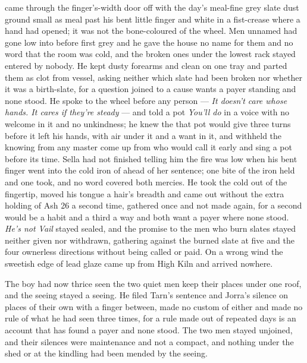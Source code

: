  came through the finger's-width door off  with the day's meal-fine grey slate dust ground small as meal past his bent little finger and white in a fist-crease where a hand had opened; it was not the bone-coloured  of the wheel. Men unnamed had gone low into  before first grey and he gave the house no name for them and no word that the room was cold, and the broken ones under the lowest rack stayed entered by nobody. He kept dusty forearms and clean on one tray and parted them as clot from vessel, asking neither which slate had been broken nor whether it was a birth-slate, for a question joined to a cause wants a payer standing and none stood. He spoke to the wheel before any person --- \emph{It doesn't care whose hands. It cares if they're steady} --- and told a pot \emph{You'll do} in a voice with no welcome in it and no unkindness; he knew the  that pot would give three turns before it left his hands, with air under it and a want in it, and withheld the knowing from any master come up from  who would call it early and sing a pot before its time. Sella had not finished telling him the fire was low when his bent finger went into the cold iron of  ahead of her sentence; one bite of the iron held and one took, and no  word covered both mercies. He took the cold out of the fingertip, moved his tongue a hair's breadth and came out without the extra holding of Ash 26 a second time, gathered once and not made again, for a second would be a habit and a third a way and both want a payer where none stood. \emph{He's not Vail} stayed sealed, and the promise to the men who burn slates stayed neither given nor withdrawn, gathering against the burned slate at five and the four ownerless directions without being called or paid. On a wrong wind the sweetish edge of lead glaze came up from High Kiln and arrived nowhere.

The boy had now thrice seen the two quiet men keep their places under one roof, and the seeing stayed a seeing. He filed Tarn's sentence and Jorra's silence on places of their own with a finger between, made no custom of either and made no rule of what he had seen three times, for a rule made out of repeated days is an account that has found a payer and none stood. The two men stayed unjoined, and their silences were maintenance and not a compact, and nothing under the shed or at the kindling had been mended by the seeing.

\scenebreak

